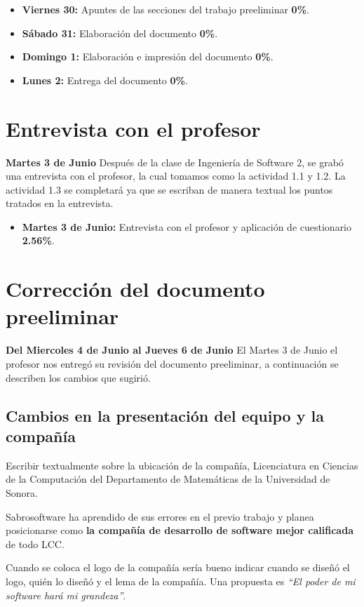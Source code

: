 \documentclass[letterpaper]{article}
\begin{document}
\begin{itemize}
  \item \textbf{Viernes 30:} Apuntes de las secciones del trabajo preeliminar \textbf{0\%}.
  \item \textbf{Sábado 31:} Elaboración del documento \textbf{0\%}.
  \item \textbf{Domingo 1:} Elaboración e impresión del documento \textbf{0\%}.
  \item \textbf{Lunes 2:} Entrega del documento \textbf{0\%}.
\end{itemize}

\section{Entrevista con el profesor}
\textbf{Martes 3 de Junio}
Después de la clase de Ingeniería de Software 2, se grabó una entrevista con el profesor, la cual tomamos como la actividad 1.1 y 1.2. La actividad 1.3 se completará ya que se escriban de manera textual los puntos tratados en la entrevista.

\begin{itemize}
\item \textbf{Martes 3 de Junio:} Entrevista con el profesor y aplicación de cuestionario \textbf{2.56\%}.
\end{itemize}

\section{Corrección del documento preeliminar}
\textbf{Del Miercoles 4 de Junio al Jueves 6 de Junio}
El Martes 3 de Junio el profesor nos entregó su revisión del documento preeliminar, a continuación se describen los cambios que sugirió.

\subsection{Cambios en la presentación del equipo y la compañía}
Escribir textualmente sobre la ubicación de la compañía, Licenciatura en Ciencias de la Computación del Departamento de Matemáticas de la Universidad de Sonora.

Sabrosoftware ha aprendido de sus errores en el previo trabajo y planea posicionarse como \textbf{la compañía de desarrollo de software mejor calificada} de todo LCC.

Cuando se coloca el logo de la compañía sería bueno indicar cuando se diseñó el logo, quién lo diseñó y el lema de la compañía. Una propuesta es \emph{``El poder de mi software hará mi grandeza''}.
\end{document}
